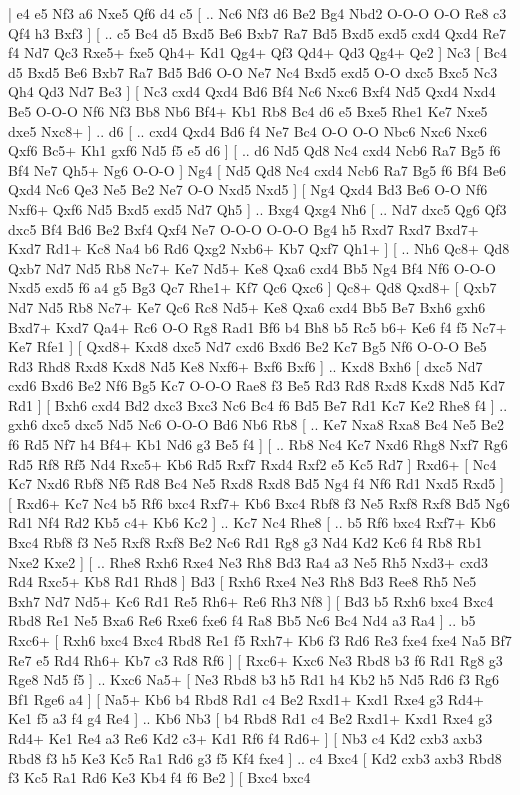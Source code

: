 \makegametitle 
|   e4   e5    Nf3   a6    Nxe5   Qf6    d4   c5 [ .. Nc6  Nf3 d6  Be2 Bg4  Nbd2 O-O-O  O-O Re8  c3 Qf4  h3 Bxf3   ]  [ .. c5  Bc4 d5  Bxd5 Be6  Bxb7 Ra7  Bd5 Bxd5  exd5 cxd4  Qxd4 Re7  f4 Nd7  Qc3 Rxe5+  fxe5 Qh4+  Kd1 Qg4+  Qf3 Qd4+  Qd3 Qg4+  Qe2   ]  Nc3 [  Bc4 d5  Bxd5 Be6  Bxb7 Ra7  Bd5 Bd6  O-O Ne7  Nc4 Bxd5  exd5 O-O  dxc5 Bxc5  Nc3 Qh4  Qd3 Nd7  Be3   ]  [  Nc3 cxd4  Qxd4 Bd6  Bf4 Nc6  Nxc6 Bxf4  Nd5 Qxd4  Nxd4 Be5  O-O-O Nf6  Nf3 Bb8  Nb6 Bf4+  Kb1 Rb8  Bc4 d6  e5 Bxe5  Rhe1 Ke7  Nxe5 dxe5  Nxc8+   ] .. d6 [ .. cxd4  Qxd4 Bd6  f4 Ne7  Bc4 O-O  O-O Nbc6  Nxc6 Nxc6  Qxf6 Bc5+  Kh1 gxf6  Nd5 f5  e5 d6   ]  [ .. d6  Nd5 Qd8  Nc4 cxd4  Ncb6 Ra7  Bg5 f6  Bf4 Ne7  Qh5+ Ng6  O-O-O   ]  Ng4 [  Nd5 Qd8  Nc4 cxd4  Ncb6 Ra7  Bg5 f6  Bf4 Be6  Qxd4 Nc6  Qe3 Ne5  Be2 Ne7  O-O Nxd5  Nxd5   ]  [  Ng4 Qxd4  Bd3 Be6  O-O Nf6  Nxf6+ Qxf6  Nd5 Bxd5  exd5 Nd7  Qh5   ] .. Bxg4    Qxg4   Nh6 [ .. Nd7  dxc5 Qg6  Qf3 dxc5  Bf4 Bd6  Be2 Bxf4  Qxf4 Ne7  O-O-O O-O-O  Bg4 h5  Rxd7 Rxd7  Bxd7+ Kxd7  Rd1+ Kc8  Na4 b6  Rd6 Qxg2  Nxb6+ Kb7  Qxf7 Qh1+   ]  [ .. Nh6  Qc8+ Qd8  Qxb7 Nd7  Nd5 Rb8  Nc7+ Ke7  Nd5+ Ke8  Qxa6 cxd4  Bb5 Ng4  Bf4 Nf6  O-O-O Nxd5  exd5 f6  a4 g5  Bg3 Qc7  Rhe1+ Kf7  Qc6 Qxc6   ]  Qc8+   Qd8    Qxd8+ [  Qxb7 Nd7  Nd5 Rb8  Nc7+ Ke7  Qc6 Rc8  Nd5+ Ke8  Qxa6 cxd4  Bb5 Be7  Bxh6 gxh6  Bxd7+ Kxd7  Qa4+ Rc6  O-O Rg8  Rad1 Bf6  b4 Bh8  b5 Rc5  b6+ Ke6  f4 f5  Nc7+ Ke7  Rfe1   ]  [  Qxd8+ Kxd8  dxc5 Nd7  cxd6 Bxd6  Be2 Kc7  Bg5 Nf6  O-O-O Be5  Rd3 Rhd8  Rxd8 Kxd8  Nd5 Ke8  Nxf6+ Bxf6  Bxf6   ] .. Kxd8   Bxh6 [  dxc5 Nd7  cxd6 Bxd6  Be2 Nf6  Bg5 Kc7  O-O-O Rae8  f3 Be5  Rd3 Rd8  Rxd8 Kxd8  Nd5 Kd7  Rd1   ]  [  Bxh6 cxd4  Bd2 dxc3  Bxc3 Nc6  Bc4 f6  Bd5 Be7  Rd1 Kc7  Ke2 Rhe8  f4   ] .. gxh6    dxc5   dxc5    Nd5   Nc6    O-O-O   Bd6    Nb6   Rb8 [ .. Ke7  Nxa8 Rxa8  Bc4 Ne5  Be2 f6  Rd5 Nf7  h4 Bf4+  Kb1 Nd6  g3 Be5  f4   ]  [ .. Rb8  Nc4 Kc7  Nxd6 Rhg8  Nxf7 Rg6  Rd5 Rf8  Rf5 Nd4  Rxc5+ Kb6  Rd5 Rxf7  Rxd4 Rxf2  e5 Kc5  Rd7   ]  Rxd6+ [  Nc4 Kc7  Nxd6 Rbf8  Nf5 Rd8  Bc4 Ne5  Rxd8 Rxd8  Bd5 Ng4  f4 Nf6  Rd1 Nxd5  Rxd5   ]  [  Rxd6+ Kc7  Nc4 b5  Rf6 bxc4  Rxf7+ Kb6  Bxc4 Rbf8  f3 Ne5  Rxf8 Rxf8  Bd5 Ng6  Rd1 Nf4  Rd2 Kb5  c4+ Kb6  Kc2   ] .. Kc7    Nc4   Rhe8 [ .. b5  Rf6 bxc4  Rxf7+ Kb6  Bxc4 Rbf8  f3 Ne5  Rxf8 Rxf8  Be2 Nc6  Rd1 Rg8  g3 Nd4  Kd2 Kc6  f4 Rb8  Rb1 Nxe2  Kxe2   ]  [ .. Rhe8  Rxh6 Rxe4  Ne3 Rh8  Bd3 Ra4  a3 Ne5  Rh5 Nxd3+  cxd3 Rd4  Rxc5+ Kb8  Rd1 Rhd8   ]  Bd3 [  Rxh6 Rxe4  Ne3 Rh8  Bd3 Ree8  Rh5 Ne5  Bxh7 Nd7  Nd5+ Kc6  Rd1 Re5  Rh6+ Re6  Rh3 Nf8   ]  [  Bd3 b5  Rxh6 bxc4  Bxc4 Rbd8  Re1 Ne5  Bxa6 Re6  Rxe6 fxe6  f4 Ra8  Bb5 Nc6  Bc4 Nd4  a3 Ra4   ] .. b5    Rxc6+ [  Rxh6 bxc4  Bxc4 Rbd8  Re1 f5  Rxh7+ Kb6  f3 Rd6  Re3 fxe4  fxe4 Na5  Bf7 Re7  e5 Rd4  Rh6+ Kb7  c3 Rd8  Rf6   ]  [  Rxc6+ Kxc6  Ne3 Rbd8  b3 f6  Rd1 Rg8  g3 Rge8  Nd5 f5   ] .. Kxc6    Na5+ [  Ne3 Rbd8  b3 h5  Rd1 h4  Kb2 h5  Nd5 Rd6  f3 Rg6  Bf1 Rge6  a4   ]  [  Na5+ Kb6  b4 Rbd8  Rd1 c4  Be2 Rxd1+  Kxd1 Rxe4  g3 Rd4+  Ke1 f5  a3 f4  g4 Re4   ] .. Kb6    Nb3 [  b4 Rbd8  Rd1 c4  Be2 Rxd1+  Kxd1 Rxe4  g3 Rd4+  Ke1 Re4  a3 Re6  Kd2 c3+  Kd1 Rf6  f4 Rd6+   ]  [  Nb3 c4  Kd2 cxb3  axb3 Rbd8  f3 h5  Ke3 Kc5  Ra1 Rd6  g3 f5  Kf4 fxe4   ] .. c4    Bxc4 [  Kd2 cxb3  axb3 Rbd8  f3 Kc5  Ra1 Rd6  Ke3 Kb4  f4 f6  Be2   ]  [  Bxc4 bxc4  
